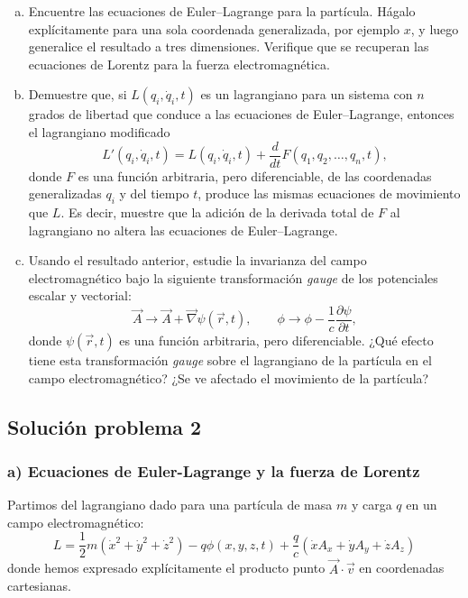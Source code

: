 \documentclass[a4paper]{article}
\begin{document}
\begin{enumerate}[a)]
  \item Encuentre las ecuaciones de Euler--Lagrange para la partícula. Hágalo explícitamente para una sola coordenada generalizada, por ejemplo $x$, y luego generalice el resultado a tres dimensiones. Verifique que se recuperan las ecuaciones de Lorentz para la fuerza electromagnética.
  
  \item Demuestre que, si $L(q_i, \dot{q}_i, t)$ es un lagrangiano para un sistema con $n$ grados de libertad que conduce a las ecuaciones de Euler--Lagrange, entonces el lagrangiano modificado
  $$L'(q_i, \dot{q}_i, t) = L(q_i, \dot{q}_i, t) + \frac{d}{dt}F(q_1, q_2, \dots, q_n, t),$$
  donde $F$ es una función arbitraria, pero diferenciable, de las coordenadas generalizadas $q_i$ y del tiempo $t$, produce las mismas ecuaciones de movimiento que $L$. Es decir, muestre que la adición de la derivada total de $F$ al lagrangiano no altera las ecuaciones de Euler--Lagrange.
  
  \item Usando el resultado anterior, estudie la invarianza del campo electromagnético bajo la siguiente transformación \textit{gauge} de los potenciales escalar y vectorial:
  $$\vec{A} \rightarrow \vec{A} + \vec{\nabla}\psi(\vec{r}, t), \qquad \phi \rightarrow \phi - \frac{1}{c}\frac{\partial \psi}{\partial t},$$
  donde $\psi(\vec{r}, t)$ es una función arbitraria, pero diferenciable. ¿Qué efecto tiene esta transformación \textit{gauge} sobre el lagrangiano de la partícula en el campo electromagnético? ¿Se ve afectado el movimiento de la partícula?
\end{enumerate}


\subsection{Solución problema 2}

\subsubsection*{a) Ecuaciones de Euler-Lagrange y la fuerza de Lorentz}

Partimos del lagrangiano dado para una partícula de masa $m$ y carga $q$ en un campo electromagnético:
$$L = \frac{1}{2}m(\dot{x}^2 + \dot{y}^2 + \dot{z}^2) - q\phi(x,y,z,t) + \frac{q}{c}(\dot{x}A_x + \dot{y}A_y + \dot{z}A_z)$$
donde hemos expresado explícitamente el producto punto $\vec{A} \cdot \vec{v}$ en coordenadas cartesianas. 
\end{document}
